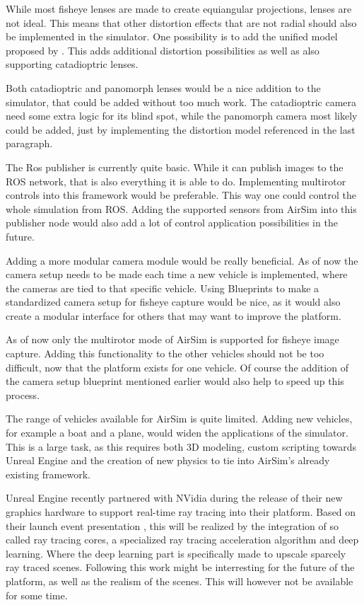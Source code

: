 While most fisheye lenses are made to create equiangular projections, lenses are not ideal. This means that other distortion effects that are not radial should also be implemented in the simulator. One possibility is to add the unified model proposed by \cite{FisheyeKalibration}. This adds additional distortion possibilities as well as also supporting catadioptric lenses.

Both catadioptric and panomorph lenses would be a nice addition to the simulator, that could be added without too much work. The catadioptric camera need some extra logic for its blind spot, while the panomorph camera most likely could be added, just by implementing the distortion model referenced in the last paragraph.

The Ros publisher is currently quite basic. While it can publish images to the ROS network, that is also everything it is able to do. Implementing multirotor controls into this framework would be preferable. This way one could control the whole simulation from ROS. Adding the supported sensors from AirSim into this publisher node would also add a lot of control application possibilities in the future.

Adding a more modular camera module would be really beneficial. As of now the camera setup needs to be made each time a new vehicle is implemented, where the cameras are tied to that specific vehicle. Using Blueprints to make a standardized camera setup for fisheye capture would be nice, as it would also create a modular interface for others that may want to improve the platform.

As of now only the multirotor mode of AirSim is supported for fisheye image capture. Adding this functionality to the other vehicles should not be too difficult, now that the platform exists for one vehicle. Of course the addition of the camera setup blueprint mentioned earlier would also help to speed up this process.

The range of vehicles available for AirSim is quite limited. Adding new vehicles, for example a boat and a plane, would widen the applications of the simulator. This is a large task, as this requires both 3D modeling, custom scripting towards Unreal Engine and the creation of new physics to tie into AirSim's already existing framework.

Unreal Engine recently partnered with NVidia during the release of their new graphics hardware to support real-time ray tracing into their platform. Based on their launch event presentation \cite{NvidiaConference}, this will be realized by the integration of so called ray tracing cores, a specialized ray tracing acceleration algorithm and deep learning. Where the deep learning part is specifically made to upscale sparcely ray traced scenes. Following this work might be interresting for the future of the platform, as well as the realism of the scenes. This will however not be available for some time.



